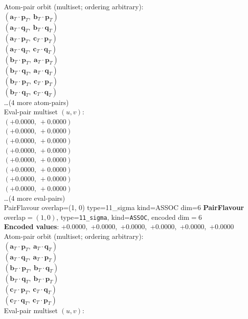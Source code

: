 \documentclass[a4paper,11pt]{article}
\newcommand{\fpbeomcfokjooi}[2]{\mathbf{#1}_T \cdot \mathbf{#2}_T}
\begin{document}
\quad Atom-pair orbit (multiset; ordering arbitrary):\\
$(\fpbeomcfokjooi{a}{p},\ \fpbeomcfokjooi{b}{p})$\\
$(\fpbeomcfokjooi{a}{q},\ \fpbeomcfokjooi{b}{q})$\\
$(\fpbeomcfokjooi{a}{p},\ \fpbeomcfokjooi{c}{p})$\\
$(\fpbeomcfokjooi{a}{q},\ \fpbeomcfokjooi{c}{q})$\\
$(\fpbeomcfokjooi{b}{p},\ \fpbeomcfokjooi{a}{p})$\\
$(\fpbeomcfokjooi{b}{q},\ \fpbeomcfokjooi{a}{q})$\\
$(\fpbeomcfokjooi{b}{p},\ \fpbeomcfokjooi{c}{p})$\\
$(\fpbeomcfokjooi{b}{q},\ \fpbeomcfokjooi{c}{q})$\\
\quad \ldots (4 more atom-pairs)\\
\quad Eval-pair multiset $(u, v)$:\\
$(+0.0000,\ +0.0000)$\\
$(+0.0000,\ +0.0000)$\\
$(+0.0000,\ +0.0000)$\\
$(+0.0000,\ +0.0000)$\\
$(+0.0000,\ +0.0000)$\\
$(+0.0000,\ +0.0000)$\\
$(+0.0000,\ +0.0000)$\\
$(+0.0000,\ +0.0000)$\\
\quad \ldots (4 more eval-pairs)\\
    PairFlavour  overlap=(1, 0)  type=11\_sigma  kind=ASSOC  dim=6
\textbf{PairFlavour} overlap$=(1, 0)$, type=\texttt{11\_sigma}, kind=\texttt{ASSOC}, encoded dim$=6$\\
\textbf{      Encoded values}: +0.0000,\ +0.0000,\ +0.0000,\ +0.0000,\ +0.0000,\ +0.0000\\
\quad Atom-pair orbit (multiset; ordering arbitrary):\\
$(\fpbeomcfokjooi{a}{p},\ \fpbeomcfokjooi{a}{q})$\\
$(\fpbeomcfokjooi{a}{q},\ \fpbeomcfokjooi{a}{p})$\\
$(\fpbeomcfokjooi{b}{p},\ \fpbeomcfokjooi{b}{q})$\\
$(\fpbeomcfokjooi{b}{q},\ \fpbeomcfokjooi{b}{p})$\\
$(\fpbeomcfokjooi{c}{p},\ \fpbeomcfokjooi{c}{q})$\\
$(\fpbeomcfokjooi{c}{q},\ \fpbeomcfokjooi{c}{p})$\\
\quad Eval-pair multiset $(u, v)$:\\
\end{document}
